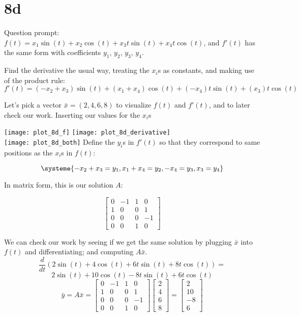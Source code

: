 \documentclass[12pt]{article}
\begin{document}
\section{8d}
Question prompt: $f(t) = x_1\sin(t) + x_2\cos(t) + x_3t\sin(t) + x_4t\cos(t)$,
and $f'(t)$ has the same form with coefficients $y_1$, $y_2$, $y_3$, $y_4$.

Find the derivative the usual way, treating the $x_i$s as constants, and making use of the product
rule: \\

\[
f'(t) = (-x_2 + x_3)\sin(t) + (x_1 + x_4)\cos(t) + (-x_4)t\sin(t) + (x_3)t\cos(t)
\]

Let's pick a vector $\bar{x}=(2,4,6,8)$ to visualize $f(t)$ and $f'(t)$, and to later check our
work. Inserting our values for the $x_i$s

\texttt{[image: plot\_8d\_f]} \texttt{[image: plot\_8d\_derivative]} \\
\texttt{[image: plot\_8d\_both]}
Define the $y_i$s in $f'(t)$ so that they correspond to same positions as the $x_i$s in $f(t)$:

\[
\systeme{-x_2 + x_3 = y_1, x_1 + x_4 = y_2, -x_4 = y_3,x_3 = y_4}
\]

In matrix form, this is our solution $A$:

\[
\begin{bmatrix}
  0 & -1 & 1 & 0 \\
  1 & 0 & 0 & 1 \\
  0 & 0 & 0 & -1 \\
  0 & 0 & 1 & 0 
\end{bmatrix}
\]

We can check our work by seeing if we get the same solution by plugging
$\bar{x}$ into $f(t)$ and differentiating; and computing $A\bar{x}$. 
\[
  \frac{d}{dt}(2\sin(t)+4\cos(t)+6t\sin(t)+8t\cos(t)) = 
\]
\[
  2\sin(t)+10\cos(t)-8t\sin(t)+6t\cos(t)
\]
\bigbreak{}
\[
  \bar{y} = A\bar{x} = 
  \begin{bmatrix}
    0 & -1 & 1 & 0 \\
    1 & 0 & 0 & 1 \\
    0 & 0 & 0 & -1 \\
    0 & 0 & 1 & 0 
    \end{bmatrix}
  \begin{bmatrix} 2 \\ 4 \\ 6 \\ 8\end{bmatrix} = 
  \begin{bmatrix} 2 \\ 10 \\ -8 \\ 6 \end{bmatrix}
\]
\end{document}

